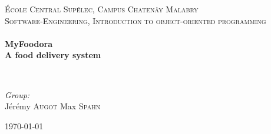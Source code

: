 \begin{titlepage}
\begin{center}



\textsc{\LARGE École Central Supélec, Campus Chatenây Malabry}\\[1.5cm]

\textsc{\Large Software-Engineering, Introduction to object-oriented programming}\\[0.5cm]

\HRule \\[0.4cm]
{ \huge \bfseries MyFoodora \\ A food delivery system \\[0.4cm] }

\HRule \\[1.5cm]

\begin{center} \large
\emph{Group:}\\
Jérémy \textsc{Augot}
Max \textsc{Spahn}
\end{center}

\vfill

{\large \today}

\end{center}
\end{titlepage}
